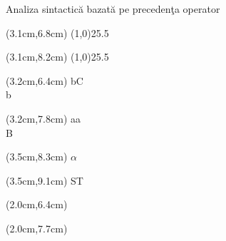 \documentclass[pdf]{beamer}
\begin{document}
\begin{frame}{Analiza sintactică bazată pe precedenţa operator}
\begin{textblock*}{11cm}(3.1cm,6.8cm)
\line(1,0){25.5}
\end{textblock*}

\begin{textblock*}{11cm}(3.1cm,8.2cm)
\line(1,0){25.5}
\end{textblock*}

\begin{textblock*}{11cm}(3.2cm,6.4cm)
\tiny{b\hspace{0.4cm}C}\\
\hspace{0.55cm}b
\end{textblock*}

\begin{textblock*}{11cm}(3.2cm,7.8cm)
\tiny{a\hspace{0.4cm}a}\\
\hspace{0.55cm}B
\end{textblock*}

\begin{textblock*}{11cm}(3.5cm,8.3cm)
\tiny{$\alpha$}
\end{textblock*}

\begin{textblock*}{11cm}(3.5cm,9.1cm)
\tiny{ST}
\end{textblock*}

\begin{textblock*}{11cm}(2.0cm,6.4cm)
\end{textblock*}

\begin{textblock*}{11cm}(2.0cm,7.7cm)
\end{textblock*}

\end{frame}
\end{document}
